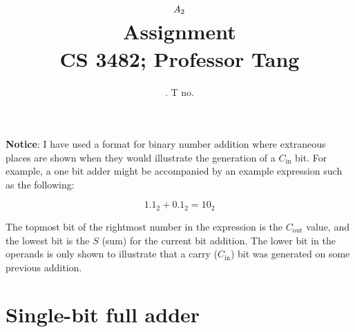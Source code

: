 \documentclass[11pt]{article}
\title{
	$A_{2}$ \\
	{\large Assignment \ass\\
	CS 3482; Professor Tang}
}
\author{
	\name. T no. \tno
}
\begin{document}
\maketitle

{\bf Notice}: I have used a format for binary number addition where extraneous places are shown when they would illustrate the generation of a $C_{\text{in}}$ bit. For example, a one bit adder might be accompanied by an example expression such as the following:

	\[
		1.1_2 + 0.1_2 = 10_2
	\]

	The topmost bit of the rightmost number in the expression is the $C_{\text{out}}$ value, and the lowest bit is the $S$ (sum) for the current bit addition. The lower bit in the operands is only shown to illustrate that a carry ($C_{\text{in}}$) bit was generated on some previous addition.

\section{Single-bit full adder}
\end{document}
